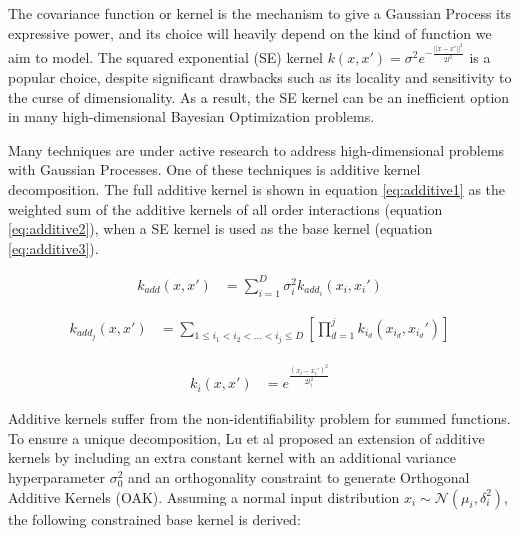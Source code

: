 \documentclass{IOS-Book-Article}
\begin{document}
	The covariance function or kernel is the mechanism to give a Gaussian Process its expressive power, and its choice will heavily depend on the kind of function we aim to model\cite{kernel-composition}. The squared exponential (SE) kernel $k(x,x') = \sigma^2 e^{-\frac{||x-x'||^2}{2l^2}}$ is a popular choice, despite significant drawbacks such as its locality and sensitivity to the curse of dimensionality\cite{curse-dimensionality}. As a result, the SE kernel can be an inefficient option in many high-dimensional Bayesian Optimization problems.
	
	Many techniques are under active research to address high-dimensional problems with Gaussian Processes\cite{gp-high-dim}\cite{gp-high-dim2}. One of these techniques is additive kernel decomposition\cite{gp-additive}. The full additive kernel is shown in equation \ref{eq:additive1} as the weighted sum of the additive kernels of all order interactions (equation \ref{eq:additive2}), when a SE kernel is used as the base kernel (equation \ref{eq:additive3}).
	
	\begin{equation} \label{eq:additive1}
		\begin{aligned}
			k_{add}(x,x') &= \sum_{i=1}^D{\sigma_i^2 k_{add_i}(x_i,x_i')}
		\end{aligned}
	\end{equation}
	
	\begin{equation} \label{eq:additive2}
		\begin{aligned}
			k_{add_j}(x,x') &= \sum_{1\leq i_1 < i_2 < \ldots < i_j\leq D} \left[\prod_{d=1}^{j} k_{i_d}(x_{i_d},x_{i_d}') \right]
		\end{aligned}
	\end{equation}
	
	\begin{equation} \label{eq:additive3}
		\begin{aligned}
			k_i(x,x') &= e^{\frac{(x_i-x_i')^2}{2l_i^2}}
		\end{aligned}
	\end{equation}
	
	Additive kernels suffer from the non-identifiability problem for summed functions. To ensure a unique decomposition, Lu et al\cite{gp-additive-orthogonal} proposed an extension of additive kernels by including an extra constant kernel with an additional variance hyperparameter $\sigma_0^2$ and an orthogonality constraint to generate Orthogonal Additive Kernels (OAK)\cite{gp-additive-orthogonal}. Assuming a normal input distribution $x_i \sim \mathcal{N}(\mu_i, \delta_i^2)$, the following constrained base kernel is derived:
	
\end{document}

